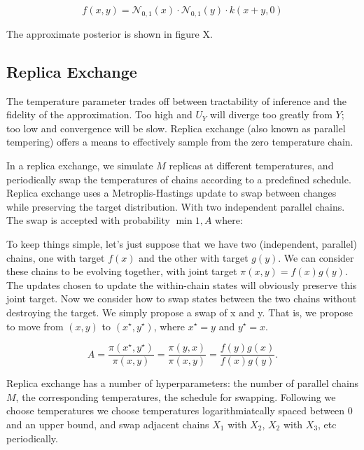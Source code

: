 $$
f(x, y) = \mathcal{N}_{0,1}(x) \cdot \mathcal{N}_{0,1}(y) \cdot k(x + y, 0) 
$$

The approximate posterior is shown in figure X.

\subsection{Replica Exchange}

The temperature parameter trades off between tractability of inference and the fidelity of the approximation.
Too high and $U_Y$ will diverge too greatly from $Y$; too low and convergence will be slow.
Replica exchange (also known as parallel tempering) \citep{swendsen1986replica} offers a means to effectively sample from the zero temperature chain.

In a replica exchange, we simulate $M$ replicas at different temperatures, and periodically swap the temperatures of chains according to a predefined schedule.
Replica exchange uses a Metroplis-Hastings update to swap between changes while preserving the target distribution.
With two independent parallel chains.
The swap is accepted with probability $\min{1, A}$ where:

To keep things simple, let’s just suppose that we have two (independent, parallel) chains, one with target $f(x)$ and the other with target $g(y)$. We can consider these chains to be evolving together, with joint target $\pi(x,y)=f(x)g(y)$. The updates chosen to update the within-chain states will obviously preserve this joint target. Now we consider how to swap states between the two chains without destroying the target. We simply propose a swap of x and y. That is, we propose to move from $(x,y)$ to $(x^\star,y^\star)$, where $x^\star=y$ and $y^\star=x$.

$$
A = \frac{\pi(x^\star,y^\star)}{\pi(x,y)} = \frac{\pi(y,x)}{\pi(x,y)} = \frac{f(y)g(x)}{f(x)g(y)}.
$$


Replica exchange has a number of hyperparameters: the number of parallel chains $M$, the corresponding temperatures, the schedule for swapping.
Following \cite{} we choose temperatures we choose temperatures logarithmiatcally spaced between $0$ and an upper bound, and swap adjacent chains $X_1$ with $X_2$, $X_2$ with $X_3$, etc periodically.


